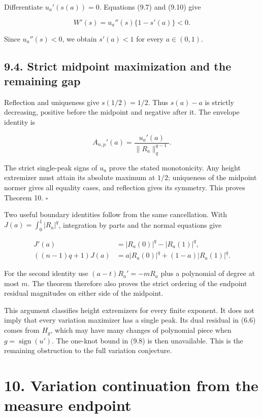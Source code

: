 \documentclass[11pt]{article}
\begin{document}
Differentiate \(u_a'(s(a))=0\). Equations (9.7) and (9.10) give

\[
W'(s)=u_a''(s)\{1-s'(a)\}<0.
\tag{9.11}
\]

Since \(u_a''(s)<0\), we obtain \(s'(a)<1\) for every \(a\in(0,1)\).

\subsection{9.4. Strict midpoint maximization and the remaining
gap}\label{strict-midpoint-maximization-and-the-remaining-gap}

Reflection and uniqueness give \(s(1/2)=1/2\). Thus \(s(a)-a\) is
strictly decreasing, positive before the midpoint and negative after it.
The envelope identity is

\[
A_{n,p}'(a)=\frac{u_a'(a)}{\|R_a\|_q^{q-1}}.
\tag{9.12}
\]

The strict single-peak signs of \(u_a\) prove the stated monotonicity.
Any height extremizer must attain its absolute maximum at \(1/2\);
uniqueness of the midpoint normer gives all equality cases, and
reflection gives its symmetry. This proves Theorem 10. \(\square\)

Two useful boundary identities follow from the same cancellation. With
\(J(a)=\int_0^1|R_a|^q\), integration by parts and the normal equations
give

\[
\begin{aligned}
J'(a)&=|R_a(0)|^q-|R_a(1)|^q,\\
((n-1)q+1)J(a)&=a|R_a(0)|^q+(1-a)|R_a(1)|^q.
\end{aligned}
\tag{9.13}
\]

For the second identity use \((a-t)R_a'=-mR_a\) plus a polynomial of
degree at most \(m\). The theorem therefore also proves the strict
ordering of the endpoint residual magnitudes on either side of the
midpoint.

This argument classifies height extremizers for every finite exponent.
It does not imply that every variation maximizer has a single peak. Its
dual residual in (6.6) comes from \(H_g\), which may have many changes
of polynomial piece when \(g=\operatorname{sign}(u')\). The one-knot
bound in (9.8) is then unavailable. This is the remaining obstruction to
the full variation conjecture.

\section{10. Variation continuation from the measure
endpoint}\label{variation-continuation-from-the-measure-endpoint}
\end{document}
